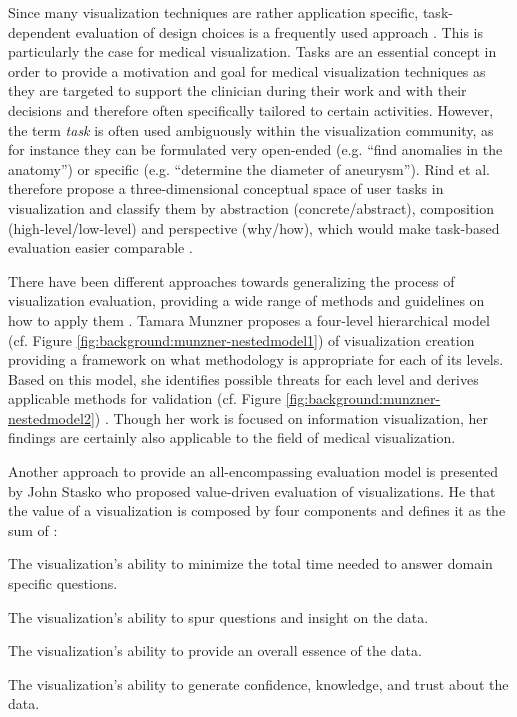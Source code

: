 Since many visualization techniques are rather application specific, task-dependent evaluation of design choices is a frequently used approach \cite{Lam:2012:EmpiricalStudies}.
This is particularly the case for medical visualization.
Tasks are an essential concept in order to provide a motivation and goal for medical visualization techniques as they are targeted to support the clinician during their work and with their decisions and therefore often specifically tailored to certain activities.
However, the term \emph{task} is often used ambiguously within the visualization community, as for instance they can be formulated very open-ended (e.g. ``find anomalies in the anatomy'') or specific (e.g. ``determine the diameter of aneurysm'').
Rind et al. therefore propose a three-dimensional conceptual space of user tasks in visualization and classify them by abstraction (concrete/abstract), composition (high-level/low-level) and perspective (why/how), which would make task-based evaluation easier comparable \cite{Rind:2014:Tasks}.

There have been different approaches towards generalizing the process of visualization evaluation, providing a wide range of methods and guidelines on how to apply them \cite{Kerren:2008:EvaluatingInformationVisualization, Plaisant:2004:ChallengeEvaluation}.
Tamara Munzner proposes a four-level hierarchical model (cf. Figure \ref{fig:background:munzner-nestedmodel1}) of visualization creation providing a framework on what methodology is appropriate for each of its levels.
Based on this model, she identifies possible threats for each level and derives applicable methods for validation (cf. Figure \ref{fig:background:munzner-nestedmodel2}) \cite{Munzner:2009:NestedModel}.
Though her work is focused on information visualization, her findings are certainly also applicable to the field of medical visualization.

Another approach to provide an all-encompassing evaluation model is presented by John Stasko who proposed value-driven evaluation of visualizations.
He  that the value of a visualization is composed by four components and defines it as the sum of \cite{Stasko:2014:ValueDrivenEvaluation}:
\begin{my_list_item}
	\item The visualization's ability to minimize the total time needed to answer domain specific questions.
	\item The visualization's ability to spur questions and insight on the data.
	\item The visualization's ability to provide an overall essence of the data.
	\item The visualization's ability to generate confidence, knowledge, and trust about the data.
\end{my_list_item}

